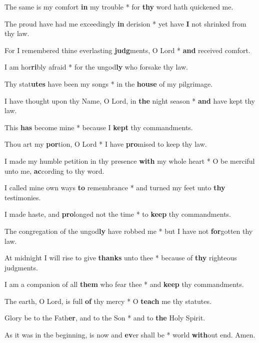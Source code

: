 \begin{multicols}{2}
	The same is my comfort \textbf{in} my trouble * for \textbf{thy} word hath quickened me.
	
	The proud have had me exceedingly \textbf{in} derision * yet have \textbf{I} not shrinked from thy law.
	
	For I remembered thine everlasting \textbf{judg}ments, O Lord * \textbf{and} received comfort.
	
	I am hor\textbf{ri}bly afraid * for the ungod\textbf{ly} who forsake thy law.
	
	Thy stat\textbf{utes} have been my songs * in the \textbf{house} of my pilgrimage.
	
	I have thought upon thy Name, O Lord, in \textbf{the} night season * \textbf{and} have kept thy law.
	
	This \textbf{has} become mine * because I \textbf{kept} thy commandments.
	
	Thou art my \textbf{por}tion, O Lord * I have \textbf{pro}mised to keep thy law.
	
	I made my humble petition in thy presence \textbf{with} my whole heart * O be merciful unto me, \textbf{ac}cording to thy word.
	
	I called mine own ways \textbf{to} remembrance * and turned my feet unto \textbf{thy} testimonies.
	
	I made haste, and \textbf{pro}longed not the time * to \textbf{keep} thy commandments.
	
	The congregation of the ungod\textbf{ly} have robbed me * but I have not \textbf{for}gotten thy law.
	
	At midnight I will rise to give \textbf{thanks} unto thee * because of \textbf{thy} righteous judgments.
	
	I am a companion of all \textbf{them} who fear thee * and \textbf{keep} thy commandments.
	
	The earth, O Lord, is full \textbf{of} thy mercy * O \textbf{teach} me thy statutes.
	
	Glory be to the Fath\textbf{er}, and to the Son * and to \textbf{the} Holy Spirit.
	
	As it was in the beginning, is now and \textbf{ev}er shall be * world \textbf{with}out end. Amen.
\end{multicols}